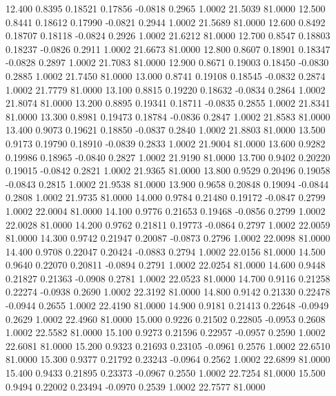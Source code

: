   12.400   0.8395   0.18521   0.17856  -0.0818   0.2965   1.0002  21.5039  81.0000
  12.500   0.8441   0.18612   0.17990  -0.0821   0.2944   1.0002  21.5689  81.0000
  12.600   0.8492   0.18707   0.18118  -0.0824   0.2926   1.0002  21.6212  81.0000
  12.700   0.8547   0.18803   0.18237  -0.0826   0.2911   1.0002  21.6673  81.0000
  12.800   0.8607   0.18901   0.18347  -0.0828   0.2897   1.0002  21.7083  81.0000
  12.900   0.8671   0.19003   0.18450  -0.0830   0.2885   1.0002  21.7450  81.0000
  13.000   0.8741   0.19108   0.18545  -0.0832   0.2874   1.0002  21.7779  81.0000
  13.100   0.8815   0.19220   0.18632  -0.0834   0.2864   1.0002  21.8074  81.0000
  13.200   0.8895   0.19341   0.18711  -0.0835   0.2855   1.0002  21.8341  81.0000
  13.300   0.8981   0.19473   0.18784  -0.0836   0.2847   1.0002  21.8583  81.0000
  13.400   0.9073   0.19621   0.18850  -0.0837   0.2840   1.0002  21.8803  81.0000
  13.500   0.9173   0.19790   0.18910  -0.0839   0.2833   1.0002  21.9004  81.0000
  13.600   0.9282   0.19986   0.18965  -0.0840   0.2827   1.0002  21.9190  81.0000
  13.700   0.9402   0.20220   0.19015  -0.0842   0.2821   1.0002  21.9365  81.0000
  13.800   0.9529   0.20496   0.19058  -0.0843   0.2815   1.0002  21.9538  81.0000
  13.900   0.9658   0.20848   0.19094  -0.0844   0.2808   1.0002  21.9735  81.0000
  14.000   0.9784   0.21480   0.19172  -0.0847   0.2799   1.0002  22.0004  81.0000
  14.100   0.9776   0.21653   0.19468  -0.0856   0.2799   1.0002  22.0028  81.0000
  14.200   0.9762   0.21811   0.19773  -0.0864   0.2797   1.0002  22.0059  81.0000
  14.300   0.9742   0.21947   0.20087  -0.0873   0.2796   1.0002  22.0098  81.0000
  14.400   0.9708   0.22047   0.20424  -0.0883   0.2794   1.0002  22.0156  81.0000
  14.500   0.9640   0.22070   0.20811  -0.0894   0.2791   1.0002  22.0254  81.0000
  14.600   0.9448   0.21827   0.21363  -0.0908   0.2781   1.0002  22.0523  81.0000
  14.700   0.9116   0.21258   0.22274  -0.0938   0.2690   1.0002  22.3192  81.0000
  14.800   0.9142   0.21330   0.22478  -0.0944   0.2655   1.0002  22.4190  81.0000
  14.900   0.9181   0.21413   0.22648  -0.0949   0.2629   1.0002  22.4960  81.0000
  15.000   0.9226   0.21502   0.22805  -0.0953   0.2608   1.0002  22.5582  81.0000
  15.100   0.9273   0.21596   0.22957  -0.0957   0.2590   1.0002  22.6081  81.0000
  15.200   0.9323   0.21693   0.23105  -0.0961   0.2576   1.0002  22.6510  81.0000
  15.300   0.9377   0.21792   0.23243  -0.0964   0.2562   1.0002  22.6899  81.0000
  15.400   0.9433   0.21895   0.23373  -0.0967   0.2550   1.0002  22.7254  81.0000
  15.500   0.9494   0.22002   0.23494  -0.0970   0.2539   1.0002  22.7577  81.0000
